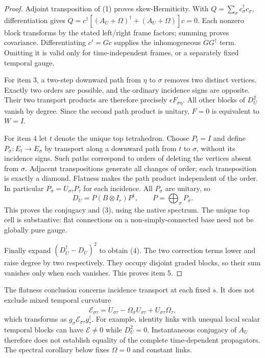 \documentclass[11pt,a4paper]{article}
\newcommand{\ad}{\dagger}
\begin{document}
\begin{proof}
Adjoint transposition of (1) proves skew-Hermiticity. With
$Q=\sum_\sigma c_\sigma^\ad c_\sigma$, differentiation gives
$\dot Q=c^\ad[(A_U+\Omega)^\ad+(A_U+\Omega)]c=0$.
Each nonzero block transforms by the stated left/right frame factors;
summing proves covariance. Differentiating $c'=Gc$ supplies the
inhomogeneous $\dot GG^\ad$ term. Omitting it is valid only for
time-independent frames, or a separately fixed temporal gauge.

For item 3, a two-step downward path from $\eta$ to $\sigma$ removes
two distinct vertices. Exactly two orders are possible, and the
ordinary incidence signs are opposite. Their two transport products
are therefore precisely $\epsilon F_{\sigma\eta}$. All other blocks
of $D_U^2$ vanish by degree. Since the second path product is unitary,
$F=0$ is equivalent to $W=I$.

For item 4 let $t$ denote the unique top tetrahedron. Choose
$P_t=I$ and define $P_\sigma:E_t\to E_\sigma$ by transport along a
downward path from $t$ to $\sigma$, without its incidence signs.
Such paths correspond to orders of deleting the vertices absent
from $\sigma$. Adjacent transpositions generate all changes of order;
each transposition is exactly a diamond. Flatness makes the path
product independent of the order. In particular
$P_\sigma=U_{\sigma\tau}P_\tau$ for each incidence. All $P_\sigma$
are unitary, so
\[
 D_U=P(B\otimes I_r)P^\ad,\qquad
 P=\bigoplus_\sigma P_\sigma .
\]
This proves the conjugacy and (3), using the native spectrum.
The unique top cell is substantive: flat connections on a
non-simply-connected base need not be globally pure gauge.

Finally expand $(D_U^\ad-D_U)^2$ to obtain (4). The two correction
terms lower and raise degree by two respectively. They occupy
disjoint graded blocks, so their sum vanishes only when each vanishes.
This proves item 5.
\end{proof}

The flatness conclusion concerns incidence transport at each fixed $s$.
It does not exclude mixed temporal curvature
\[
 \mathcal E_{\sigma\tau}
 =\dot U_{\sigma\tau}-\Omega_\sigma U_{\sigma\tau}
                    +U_{\sigma\tau}\Omega_\tau ,
\]
which transforms as $g_\sigma\mathcal E_{\sigma\tau}g_\tau^\ad$.
For example, identity links with unequal local scalar temporal blocks
can have $\mathcal E\ne0$ while $D_U^2=0$.
Instantaneous conjugacy of $A_U$ therefore does not establish equality
of the complete time-dependent propagators. The spectral corollary
below fixes $\Omega=0$ and constant links.
\end{document}

